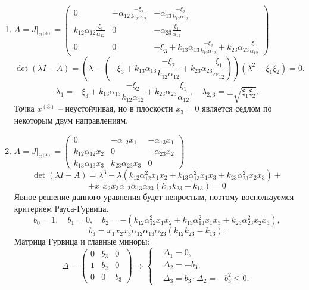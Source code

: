 \begin{enumerate}
        \item \(
            A = J \big|_{x^{(3)}} = \left(\begin{matrix}
                0 & -\alpha_{12} \frac{-\xi_2}{k_{12} \alpha_{12}} & -\alpha_{13} \frac{-\xi_2}{k_{12} \alpha_{12}} \\[10pt]
                k_{12} \alpha_{12} \frac{\xi_1}{\alpha_{12}} & 0 & -\alpha_{23} \frac{\xi_1}{\alpha_{12}} \\[10pt]
                0 & 0 & -\xi_3 + k_{13} \alpha_{13} \frac{-\xi_2}{k_{12} \alpha_{12}} + k_{23} \alpha_{23} \frac{\xi_1}{\alpha_{12}}
            \end{matrix}\right)
        \)
        \[
            \det(\lambda I - A) = \left(\lambda - \left(-\xi_3 + k_{13} \alpha_{13} \frac{-\xi_2}{k_{12} \alpha_{12}} + k_{23} \alpha_{23} \frac{\xi_1}{\alpha_{12}} \right) \right)(\lambda^2 - \xi_1 \xi_2) = 0.
        \]
        \[
            \lambda_1 = -\xi_3 + k_{13} \alpha_{13} \frac{-\xi_2}{k_{12} \alpha_{12}} + k_{23} \alpha_{23} \frac{\xi_1}{\alpha_{12}}, \quad \lambda_{2,3} = \pm \sqrt{\xi_1 \xi_2}.
        \]
        Точка \( x^{(3)} \) -- неустойчивая, но в плоскости \( x_3 = 0 \) является седлом по некоторым двум направлениям.

        \item \(
            A = J \big|_{x^{(4)}} = \left(\begin{matrix}
                0 & -\alpha_{12} x_1 & -\alpha_{13} x_1 \\
                k_{12} \alpha_{12} x_2 & 0 & -\alpha_{23} x_2 \\
                k_{13} \alpha_{13} x_3 & k_{23} \alpha_{23} x_3 & 0
            \end{matrix}\right)
        \)
        \[
            \det(\lambda I - A) = \lambda^3 - \lambda (k_{12} \alpha_{12}^2 x_1 x_2 + k_{13} \alpha_{13}^2 x_1 x_3 + k_{23} \alpha_{23}^2 x_2 x_3) +
        \]
        \[
            + x_1 x_2 x_3 \alpha_{12} \alpha_{13} \alpha_{23} (k_{12} k_{23} - k_{13}) = 0
        \]
        Явное решение данного уравнения будет непростым, поэтому воспользуемся критерием Рауса-Гурвица.
        \[
            b_0 = 1, \quad b_1 = 0, \quad b_2 = -(k_{12} \alpha_{12}^2 x_1 x_2 + k_{13} \alpha_{13}^2 x_1 x_3 + k_{23} \alpha_{23}^2 x_2 x_3),
        \]
        \[
            b_3 = x_1 x_2 x_3 \alpha_{12} \alpha_{13} \alpha_{23} (k_{12} k_{23} - k_{13}).
        \]
        Матрица Гурвица и главные миноры:
        \[
            \Delta = \left( \begin{matrix}
                0 & b_3 & 0 \\
                1 & b_2 & 0 \\
                0   & 0 & b_3
            \end{matrix} \right)
            \Rightarrow 
            \left\{ \begin{split}
                & \Delta_1 = 0, \\
                & \Delta_2 = -b_3, \\
                & \Delta_3 = b_3 \cdot \Delta_2 = -b_3^2 \leq 0.
            \end{split} \right.
        \]
    \end{enumerate}